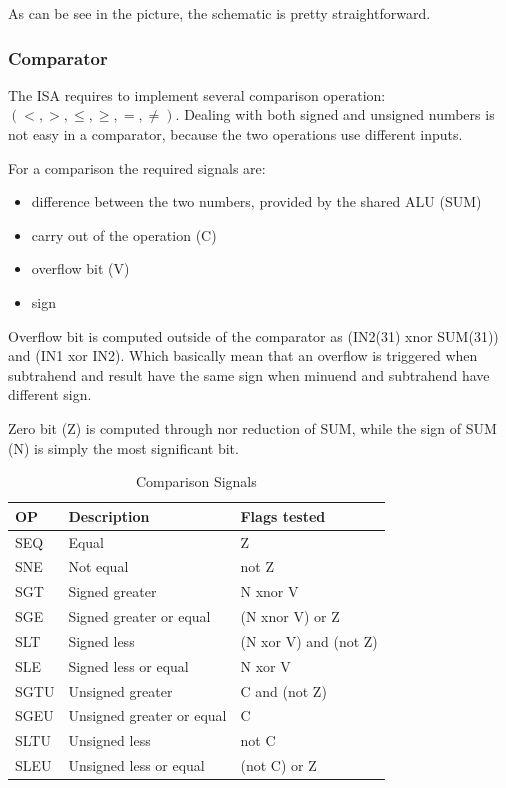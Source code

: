 \documentclass[12pt]{article}
\begin{document}
As can be see in the picture, the schematic is pretty straightforward.


\subsubsection{Comparator}
The ISA requires to implement several comparison operation: $(<, >, \leq, \geq, =, \neq)$.
Dealing with both signed and unsigned numbers is not easy in a comparator, because the two operations use different inputs.

For a comparison the required signals are:
\begin{itemize}
	\item difference between the two numbers, provided by the shared ALU (SUM)
	\item carry out of the operation (C)
	\item overflow bit (V)
	\item sign
\end{itemize}
Overflow bit is computed outside of the comparator as (IN2(31) xnor SUM(31)) and (IN1 xor IN2).
Which basically mean that an overflow is triggered when subtrahend and result have the same sign when minuend and subtrahend have different sign.

Zero bit (Z) is computed through nor reduction of SUM, while the sign of SUM (N) is simply the most significant bit.
\begin{table}
\begin{center}
	\begin{tabular}{ | l | l | l |}
		\hline
		\rowcolor{LimeGreen} OP & Description & Flags tested \\ \hline
		SEQ & Equal & Z \\ \hline
		SNE & Not equal &  not Z \\ \hline
		SGT & Signed greater & N xnor V \\ \hline
		SGE & Signed greater or equal & (N  xnor  V) or Z \\ \hline
		SLT & Signed less & (N xor V) and (not Z)\\ \hline
		SLE & Signed less or equal & N xor V \\ \hline
		SGTU & Unsigned greater & C and (not Z) \\ \hline
		SGEU & Unsigned greater or equal & C \\ \hline
		SLTU & Unsigned less & not C \\ \hline
		SLEU & Unsigned less or equal & (not C) or Z  \\ \hline
	\end{tabular}
		\caption{Comparison Signals}
		\label{COMPA}
\end{center}
\end{table}
\end{document}
